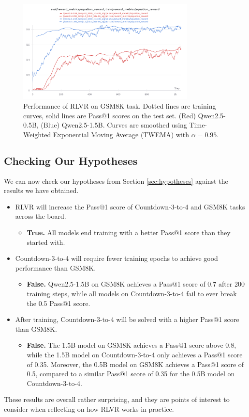 \documentclass{article} %
\theoremstyle{definition}
\begin{document}
\begin{figure}
    \centering
    \includegraphics[width=0.8\textwidth]{images/GSM8K.png}
    \caption{
        Performance of RLVR on GSM8K task. 
        Dotted lines are training curves, 
        solid lines are Pass@1 scores on the test set.
        (Red) Qwen2.5-0.5B, (Blue) Qwen2.5-1.5B.
        Curves are smoothed using Time-Weighted Exponential Moving Average (TWEMA) with $\alpha = 0.95$.
    }
    \label{fig:gsm8k-results}
\end{figure}

\subsection{Checking Our Hypotheses}
We can now check our hypotheses from Section \ref{sec:hypotheses} against the 
results we have obtained.
\begin{itemize}
    \item RLVR will increase the Pass@1 score of Countdown-3-to-4 and GSM8K tasks across the board.
        \begin{itemize}
            \item \textbf{True.} All models end training with a better Pass@1 score than they started with.
        \end{itemize}
    \item Countdown-3-to-4 will require fewer training epochs to achieve good performance than GSM8K.
        \begin{itemize}
            \item \textbf{False.} Qwen2.5-1.5B on GSM8K achieves a Pass@1 score of 0.7 after 200 training steps,
                while all models on Countdown-3-to-4 fail to ever break the 0.5 Pass@1 score.
        \end{itemize}
    \item After training, Countdown-3-to-4 will be solved with a higher Pass@1 score than GSM8K.
        \begin{itemize}
            \item \textbf{False.} The 1.5B model on GSM8K achieves a Pass@1 score above 0.8, 
                while the 1.5B model on Countdown-3-to-4 only achieves a Pass@1 score of 0.35.
                Moreover, the 0.5B model on GSM8K achieves a Pass@1 score of 0.5, compared to 
                a similar Pass@1 score of 0.35 for the 0.5B model on Countdown-3-to-4.
        \end{itemize}
\end{itemize}
These results are overall rather surprising, and they are points of interest to consider
when reflecting on how RLVR works in practice.
\end{document}
